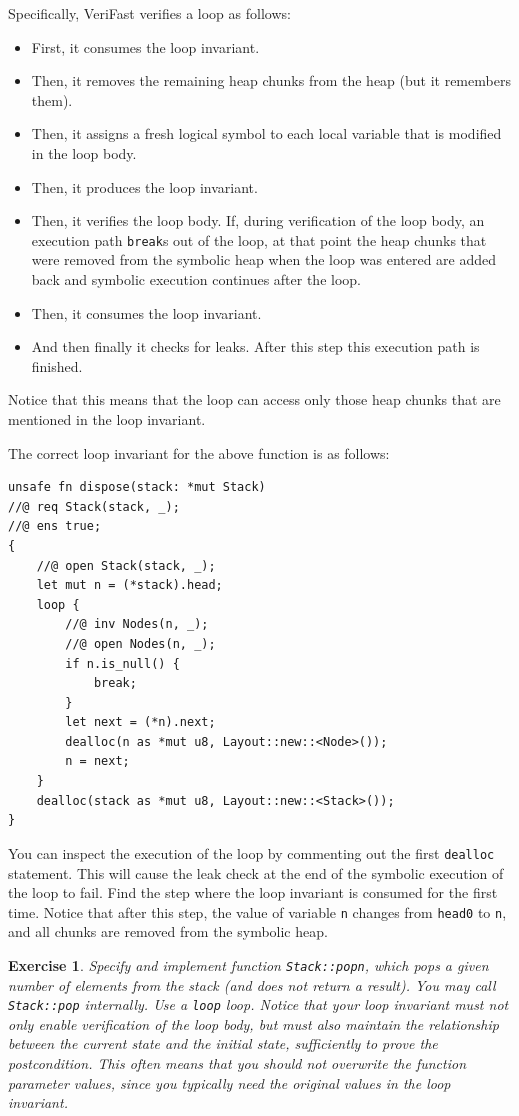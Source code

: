 \documentclass{article}
\newtheorem{exercise}{Exercise}
\begin{document}
Specifically, VeriFast verifies a loop as follows:
\begin{itemize}
\item First, it consumes the loop invariant.
\item Then, it removes the remaining heap chunks from the
    heap (but it remembers them).
\item Then, it assigns a fresh logical symbol to each local
    variable that is modified in the loop body.
\item Then, it produces the loop invariant.
\item Then, it verifies the loop body. If, during verification of the loop body, an execution path \lstinline|break|s out of the loop, at that point the heap chunks that were removed from the symbolic heap when the loop was entered are added back and symbolic execution continues after the loop.
\item Then, it consumes the loop invariant.
\item And then finally it checks for leaks.
        After this step this execution path is
        finished.
\end{itemize}
Notice that this means that the loop can access only those heap
chunks that are mentioned in the loop invariant.

The correct loop invariant for the above function is as
follows:
\begin{lstlisting}
unsafe fn dispose(stack: *mut Stack)
//@ req Stack(stack, _);
//@ ens true;
{
    //@ open Stack(stack, _);
    let mut n = (*stack).head;
    loop {
        //@ inv Nodes(n, _);
        //@ open Nodes(n, _);
        if n.is_null() {
            break;
        }
        let next = (*n).next;
        dealloc(n as *mut u8, Layout::new::<Node>());
        n = next;
    }
    dealloc(stack as *mut u8, Layout::new::<Stack>());
}
\end{lstlisting}

You can inspect the execution of the loop
by commenting out the first \lstinline|dealloc| statement. This will cause
the leak check at the end of the symbolic execution of the loop to fail. Find the
step where the loop invariant is consumed for the first time.
Notice that after this step, the value
of variable \lstinline!n! changes from \lstinline!head0! to
\lstinline!n!, and all chunks are removed from the symbolic
heap.

\begin{exercise}\label{exercise:popn}
Specify and implement function \lstinline!Stack::popn!, which
pops a given number of elements from the stack (and does not
return a result). You may call \lstinline!Stack::pop!
internally. Use a \lstinline!loop! loop. Notice that your loop
invariant must not only enable verification of the loop body,
but must also maintain the relationship between the current
state and the initial state, sufficiently to prove the
postcondition. This often means that you should not overwrite
the function parameter values, since you typically need the
original values in the loop invariant.
\end{exercise}
\end{document}
